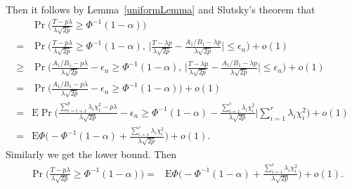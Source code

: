 \documentclass[review]{elsarticle}
\theoremstyle{plain}
\theoremstyle{definition}
\theoremstyle{remark}
\begin{document}
Then it follows by Lemma~\ref{uniformLemma} and Slutsky's theorem that
\begin{equation}
    \begin{aligned}
        &\Pr\Big(\frac{T-p\lambda}{\lambda\sqrt{2p}}\geq \Phi^{-1}(1-\alpha)\Big)\\
        =&\Pr\Big(\frac{T-p\lambda}{\lambda\sqrt{2p}}\geq \Phi^{-1}(1-\alpha),\,
        \Big|\frac{T-{\lambda p}}{\lambda\sqrt{2p}
        }-
    \frac{{A_1}/{B_1}-{\lambda p}}{\lambda\sqrt{2p}
        }\Big|\leq\epsilon_n \Big)+o(1)\\
        \geq&\Pr\Big(\frac{A_1/B_1-p\lambda}{\lambda\sqrt{2p}}-\epsilon_n\geq  \Phi^{-1}(1-\alpha),\,
        \Big|\frac{T-{\lambda p}}{\lambda\sqrt{2p}
        }-
    \frac{{A_1}/{B_1}-{\lambda p}}{\lambda\sqrt{2p}
        }\Big|\leq\epsilon_n \Big)+o(1)\\
        =&\Pr\Big(\frac{A_1/B_1-p\lambda}{\lambda\sqrt{2p}}-\epsilon_n \geq \Phi^{-1}(1-\alpha)\Big)+o(1)\\
        =&\textrm{E}\Pr\Big(\frac{\sum_{i=r+1}^p \lambda_i \chi^2_1-p\lambda}{\lambda\sqrt{2p}}-\epsilon_n\geq  \Phi^{-1}(1-\alpha) -\frac{\sum_{i=1}^r \lambda_i \chi^2_i}{\lambda\sqrt{2p}}\Big|\sum_{i=1}^r \lambda_i \chi^2_i \Big)+o(1)\\
        =& \textrm{E}\Phi\Big( -\Phi^{-1}(1-\alpha) +\frac{\sum_{i=1}^r \lambda_i \chi^2_i}{\lambda\sqrt{2p}} \Big)+o(1).
    \end{aligned}
\end{equation}
Similarly we get the lower bound. Then
\begin{equation}
    \begin{aligned}
        &\Pr\Big(\frac{T-p\lambda}{\lambda\sqrt{2p}}\geq \Phi^{-1}(1-\alpha)\Big)
        =& \textrm{E}\Phi\Big( -\Phi^{-1}(1-\alpha) +\frac{\sum_{i=1}^r \lambda_i \chi^2_i}{\lambda\sqrt{2p}} \Big)+o(1).
    \end{aligned}
\end{equation}
\end{document}
